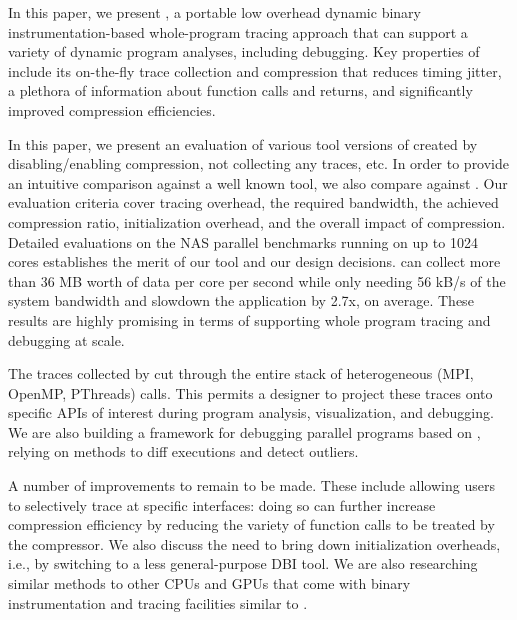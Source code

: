 
In this paper, 
we present \parlot, a portable low overhead dynamic
binary instrumentation-based
whole-program
tracing approach that can support a variety of 
dynamic program analyses, including debugging.
%
Key properties of \parlot include its on-the-fly trace collection and
compression that reduces timing jitter, a plethora of information
about function calls and returns, and
significantly improved compression efficiencies.


In this paper, we present an evaluation of various tool versions of \parlot
created by disabling/enabling compression, not collecting any traces, etc.
%
In order to provide an intuitive comparison against a well known tool,
we also compare \parlot against \callgrind.
%
Our evaluation criteria cover tracing overhead, the required bandwidth,
the achieved compression ratio, initialization overhead, and the 
overall impact of compression.
%
Detailed evaluations on the NAS parallel benchmarks running on
up to 1024 cores establishes the merit of our tool and our design decisions. 
\parlot can collect more than 36 MB worth of data per core per second while 
only needing 56 kB/s of the system bandwidth and slowdown the 
application by 2.7x, on average.
%
These results are highly promising in terms of supporting 
whole program tracing and debugging at scale.


The traces collected by \parlot cut through the entire stack of heterogeneous
(MPI, OpenMP, PThreads) calls. 
%
This permits a designer to project these traces onto specific
APIs of interest during program analysis, visualization, and debugging.
%
We are also building a framework for debugging parallel
programs based on \parlot, relying on
methods to diff executions and detect outliers.


A number of improvements to \parlot remain to be made.
%
These include allowing users to selectively trace at specific
interfaces: doing so can further increase compression efficiency
by reducing the variety of function calls to be treated by
the compressor.
%
We also discuss the need to bring down initialization overheads, i.e.,
by switching to a less general-purpose DBI tool.
%
We are also researching similar methods to
other CPUs and GPUs that come with binary instrumentation and tracing
facilities similar to \pin.
%

